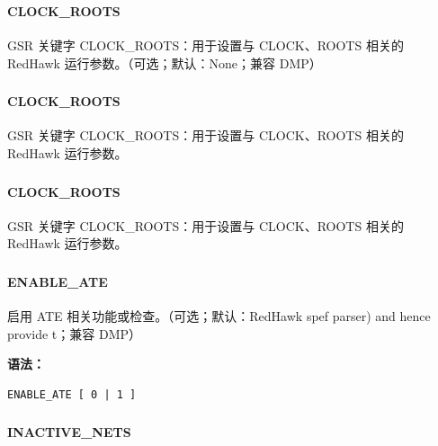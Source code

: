 \subsubsection{}
\paragraph*{CLOCK_ROOTS}

GSR 关键字 CLOCK_ROOTS：用于设置与 CLOCK、ROOTS 相关的 RedHawk 运行参数。（可选；默认：None；兼容 DMP）

\subsubsection{}
\paragraph*{CLOCK_ROOTS}

GSR 关键字 CLOCK_ROOTS：用于设置与 CLOCK、ROOTS 相关的 RedHawk 运行参数。

\subsubsection{}
\paragraph*{CLOCK_ROOTS}

GSR 关键字 CLOCK_ROOTS：用于设置与 CLOCK、ROOTS 相关的 RedHawk 运行参数。

\subsubsection{}
\paragraph*{ENABLE_ATE}

启用 ATE 相关功能或检查。（可选；默认：RedHawk spef parser) and hence provide t；兼容 DMP）

\textbf{语法：}
\begin{lstlisting}
ENABLE_ATE [ 0 | 1 ]
\end{lstlisting}

\subsubsection{}
\paragraph*{INACTIVE_NETS}

